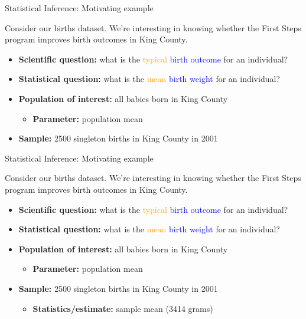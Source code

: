 \documentclass[10pt,t]{beamer}
\begin{document}
\begin{frame}{Statistical Inference: Motivating example}

Consider our births dataset. We're interesting in knowing whether the First Steps program improves birth outcomes in King County.

\vspace{0.1cm}

\begin{itemize}
	\item \textbf{Scientific question:} what is the \textcolor{orange}{typical}  \textcolor{blue}{birth outcome} for an individual?
	\item \textbf{Statistical question:} what is the \textcolor{orange}{mean} \textcolor{blue}{birth weight} for an individual?
	\item \textbf{Population of interest:} all babies born in King County
	\begin{itemize}
		\item \textbf{Parameter:} population mean
	\end{itemize}
	\item \textbf{Sample:} 2500 singleton births in King County in 2001
\end{itemize}

\end{frame}

\begin{frame}{Statistical Inference: Motivating example}

Consider our births dataset. We're interesting in knowing whether the First Steps program improves birth outcomes in King County.

\vspace{0.1cm}

\begin{itemize}
	\item \textbf{Scientific question:} what is the \textcolor{orange}{typical}  \textcolor{blue}{birth outcome} for an individual?
	\item \textbf{Statistical question:} what is the \textcolor{orange}{mean} \textcolor{blue}{birth weight} for an individual?
	\item \textbf{Population of interest:} all babies born in King County
	\begin{itemize}
		\item \textbf{Parameter:} population mean
	\end{itemize}
	\item \textbf{Sample:} 2500 singleton births in King County in 2001
	\begin{itemize}
		\item \textbf{Statistics/estimate:} sample mean (3414 grams)
	\end{itemize}
\end{itemize}

\end{frame}
\end{document}
